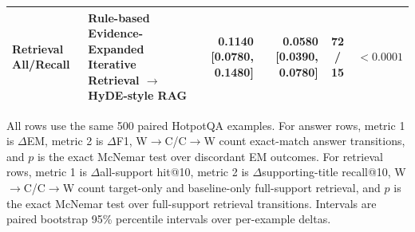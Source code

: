 \begin{table}[t]
\begin{threeparttable}
\begin{tabularx}{\textwidth}{>{\raggedright\arraybackslash}p{}
                            >{\raggedright\arraybackslash}X
                            r r c c}
Retrieval All/Recall & Rule-based Evidence-Expanded Iterative Retrieval $\rightarrow$ HyDE-style RAG & 0.1140 [0.0780, 0.1480] & 0.0580 [0.0390, 0.0780] & 72 / 15 & $<0.0001$ \\
\bottomrule
\end{tabularx}
\begin{tablenotes}
\footnotesize
\item All rows use the same 500 paired HotpotQA examples. For answer rows, metric 1 is $\Delta$EM, metric 2 is $\Delta$F1, W$\rightarrow$C/C$\rightarrow$W count exact-match answer transitions, and $p$ is the exact McNemar test over discordant EM outcomes. For retrieval rows, metric 1 is $\Delta$all-support hit@10, metric 2 is $\Delta$supporting-title recall@10, W$\rightarrow$C/C$\rightarrow$W count target-only and baseline-only full-support retrieval, and $p$ is the exact McNemar test over full-support retrieval transitions. Intervals are paired bootstrap 95\% percentile intervals over per-example deltas.
\end{tablenotes}
\end{threeparttable}
\end{table}
